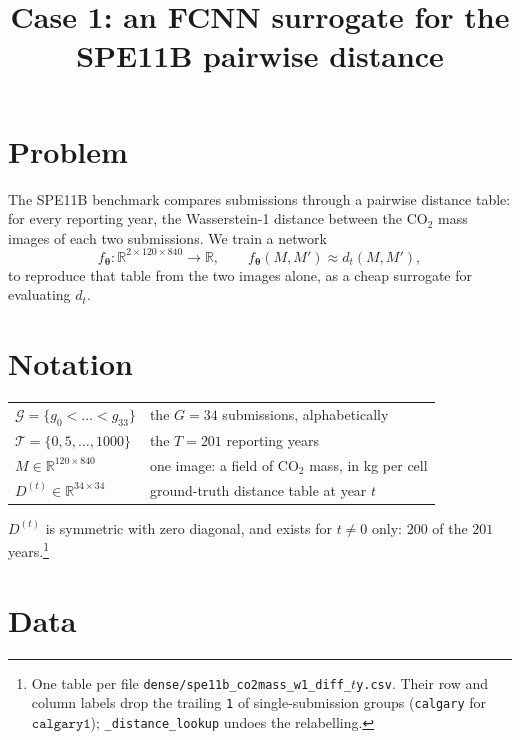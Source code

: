 \documentclass[11pt]{article}
\title{Case 1: an FCNN surrogate for the SPE11B pairwise distance}
\author{}
\date{}
\newcommand{\R}{\mathbb{R}}
\newcommand{\Gr}{\mathcal{G}}
\newcommand{\Ti}{\mathcal{T}}
\begin{document}
\maketitle

\section{Problem}

The SPE11B benchmark compares submissions through a pairwise distance table:
for every reporting year, the Wasserstein-1 distance between the CO$_2$ mass
images of each two submissions. We train a network
%
\begin{equation}
  f_{\boldsymbol\theta} : \R^{2 \times 120 \times 840} \to \R,
  \qquad
  f_{\boldsymbol\theta}(M, M') \approx d_t(M, M'),
  \label{eq:problem}
\end{equation}
%
to reproduce that table from the two images alone, as a cheap surrogate for
evaluating $d_t$.

\section{Notation}

\begin{center}
\begin{tabular}{ll}
  \toprule
  $\Gr = \{g_0 < \dots < g_{33}\}$ & the $G = 34$ submissions, alphabetically \\
  $\Ti = \{0, 5, \dots, 1000\}$ & the $T = 201$ reporting years \\
  $M \in \R^{120 \times 840}$ & one image: a field of CO$_2$ mass, in kg per cell \\
  $D^{(t)} \in \R^{34 \times 34}$ & ground-truth distance table at year $t$ \\
  \bottomrule
\end{tabular}
\end{center}

\noindent
$D^{(t)}$ is symmetric with zero diagonal, and exists for $t \neq 0$ only:
$200$ of the $201$ years.\footnote{One table per file
\texttt{dense/spe11b\_co2mass\_w1\_diff\_$t$y.csv}. Their row and column labels
drop the trailing \texttt{1} of single-submission groups
(\texttt{calgary} for $\texttt{calgary1}$); \texttt{\_distance\_lookup} undoes
the relabelling.}

\section{Data}
\end{document}

